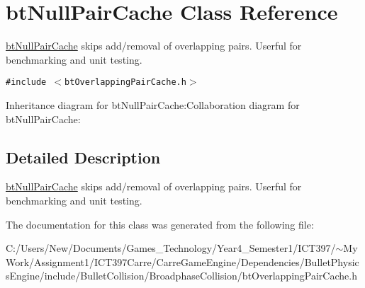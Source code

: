 \hypertarget{classbt_null_pair_cache}{
\section{btNullPairCache Class Reference}
\label{classbt_null_pair_cache}
}
\hyperlink{classbt_null_pair_cache}{btNullPairCache} skips add/removal of overlapping pairs. Userful for benchmarking and unit testing.  


{\tt \#include $<$btOverlappingPairCache.h$>$}

Inheritance diagram for btNullPairCache:Collaboration diagram for btNullPairCache:

\subsection{Detailed Description}
\hyperlink{classbt_null_pair_cache}{btNullPairCache} skips add/removal of overlapping pairs. Userful for benchmarking and unit testing. 

The documentation for this class was generated from the following file:\begin{CompactItemize}
\item 
C:/Users/New/Documents/Games\_\-Technology/Year4\_\-Semester1/ICT397/$\sim$My Work/Assignment1/ICT397Carre/CarreGameEngine/Dependencies/BulletPhysicsEngine/include/BulletCollision/BroadphaseCollision/btOverlappingPairCache.h\end{CompactItemize}
